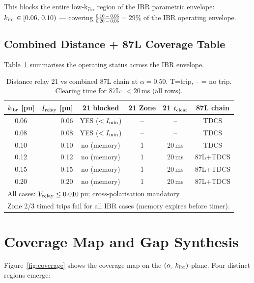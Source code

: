\documentclass[11pt,a4paper]{article}
\begin{document}
This blocks the entire low-k\textsubscript{ibr} region of the IBR
parametric envelope:
$k_{\rm ibr} \in [0.06,\,0.10)$ — covering
$\frac{0.10 - 0.06}{0.20 - 0.06} = 29\%$ of the IBR operating envelope.

\subsection{Combined Distance + 87L Coverage Table}

Table~\ref{tab:coverage} summarises the operating status across the
IBR envelope.

\begin{table}[h!]
\centering
\caption{Distance relay 21 vs combined 87L chain at $\alpha = 0.50$.
         T=trip, -- = no trip.  Clearing time for 87L: $<20$\,ms (all rows).}
\label{tab:coverage}
\begin{tabular}{crcccc}
\toprule
$k_{\rm ibr}$ [pu] & $I_{\rm relay}$ [pu] & 21 blocked & 21 Zone & 21 $t_{\rm clear}$ & 87L chain \\
\midrule
0.06 & 0.06 & YES ($<I_{\rm min}$) & -- & -- & TDCS \\
0.08 & 0.08 & YES ($<I_{\rm min}$) & -- & -- & TDCS \\
0.10 & 0.10 & no (memory) & 1 & 20\,ms & TDCS \\
0.12 & 0.12 & no (memory) & 1 & 20\,ms & 87L+TDCS \\
0.15 & 0.15 & no (memory) & 1 & 20\,ms & 87L+TDCS \\
0.20 & 0.20 & no (memory) & 1 & 20\,ms & 87L+TDCS \\
\bottomrule
\multicolumn{6}{l}{\footnotesize All cases: $V_{\rm relay} \leq 0.010$\,pu; cross-polarisation mandatory.}\\
\multicolumn{6}{l}{\footnotesize Zone 2/3 timed trips fail for all IBR cases (memory expires before timer).}
\end{tabular}
\end{table}

\section{Coverage Map and Gap Synthesis}

Figure~\ref{fig:coverage} shows the coverage map on the
$(\alpha,\, k_{\rm ibr})$ plane.  Four distinct regions emerge:
\end{document}
